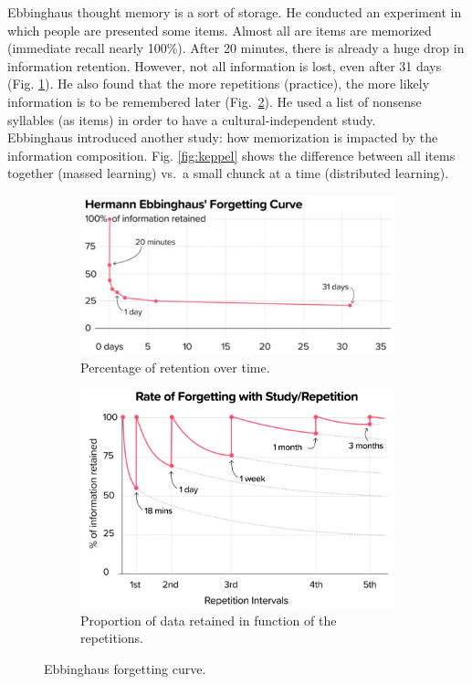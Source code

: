 Ebbinghaus thought memory is a sort of storage.
He conducted an experiment in which people are presented some items. Almost all are items are memorized (immediate recall nearly 100\%). After 20 minutes, there is already a huge drop in information retention. However, not all information is lost, even after 31 days (Fig. \ref{fig:ebbinghaus}). He also found that the more repetitions (practice), the more likely 
information is to be remembered later (Fig.~\ref{fig:ebbinghaus_2}).
He used a list of nonsense syllables (as items) in order to have a cultural-independent study.\\
Ebbinghaus introduced another study: how memorization is impacted by the information composition.
Fig. \ref{fig:keppel} shows the difference between all items together (massed learning) vs.~a small chunck at a time (distributed learning).

\begin{figure}[!ht]
    \centering
    \captionsetup{width=.8\linewidth}
    \begin{subfigure}{.49\textwidth}
        \centering
        \captionsetup{width=.8\linewidth}
        \includegraphics[width=.9\linewidth]{images/ebbinghaus.png}
        \caption{Percentage of retention over time.}
        \label{fig:ebbinghaus}
    \end{subfigure}
    \begin{subfigure}{.49\textwidth}
        \centering
        \captionsetup{width=.8\linewidth}
        \includegraphics[width=.85\linewidth]{images/ebbinghaus_2.png}
        \caption{Proportion of data retained in function of the repetitions.}
        \label{fig:ebbinghaus_2}
    \end{subfigure}
    \caption{Ebbinghaus forgetting curve.}
    \label{fig:ebbinghaus_1}
\end{figure}

